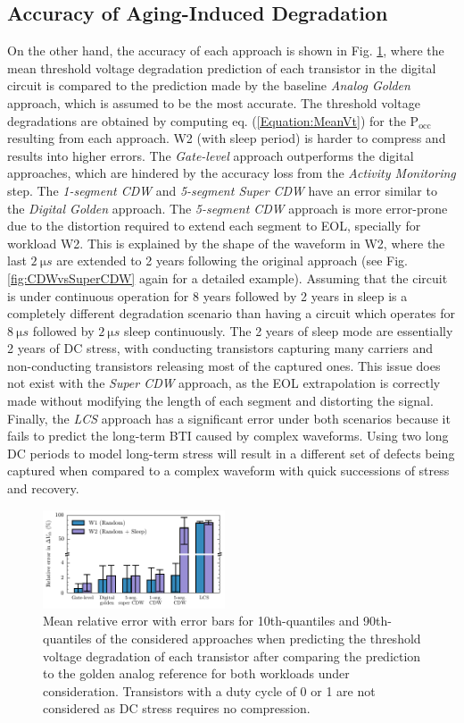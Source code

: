 \subsection{Accuracy of Aging-Induced Degradation}
On the other hand, the accuracy of each approach is shown in Fig. \ref{fig:Mean error}, where the mean threshold voltage degradation prediction of each transistor in the digital circuit is compared to the prediction made by the baseline \textit{Analog Golden} approach, which is assumed to be the most accurate. The threshold voltage degradations are obtained by computing eq. (\ref{Equation:MeanVt}) for the $\text{P}_{\text{occ}}$ resulting from each approach. W2 (with sleep period) is harder to compress and results into higher errors. The \textit{Gate-level} approach outperforms the digital approaches, which are hindered by the accuracy loss from the \textit{Activity Monitoring} step. The \textit{1-segment CDW} and \textit{5-segment Super CDW} have an error similar to the \textit{Digital Golden} approach. The \textit{5-segment CDW} approach is more error-prone due to the distortion required to extend each segment to EOL, specially for workload W2. This is explained by the shape of the waveform in W2, where the last $\qty{2}{\micro s}$ are extended to 2 years following the original approach (see Fig. \ref{fig:CDWvsSuperCDW} again for a detailed example). Assuming that the circuit is under continuous operation for 8 years followed by 2 years in sleep is a completely different degradation scenario than having a circuit which operates for $\qty{8}{\micro s}$ followed by $\qty{2}{\micro s}$ sleep continuously. The 2 years of sleep mode are essentially 2 years of DC stress, with conducting transistors capturing many carriers and non-conducting transistors releasing most of the captured ones. This issue does not exist with the \textit{Super CDW} approach, as the EOL extrapolation is correctly made without modifying the length of each segment and distorting the signal. Finally, the \textit{LCS} approach has a significant error under both scenarios because it fails to predict the long-term \gls{BTI} caused by complex waveforms. Using two long DC periods to model long-term stress will result in a different set of defects being captured when compared to a complex waveform with quick successions of stress and recovery. 
\begin{figure}[!t]
    \includegraphics[width=0.48\textwidth,trim={0 1mm 0 0},clip]{images/ch2/mean_error_bar_scatter_report_plot.pdf}
    \caption{Mean relative error with error bars for 10th-quantiles and 90th-quantiles of the considered approaches when predicting the threshold voltage degradation of each transistor after comparing the prediction to the golden analog reference for both workloads under consideration. Transistors with a duty cycle of 0 or 1 are not considered as DC stress requires no compression. }
    \label{fig:Mean error}
\end{figure}

